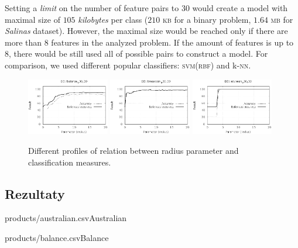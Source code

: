 \documentclass[]{article}
\begin{document}
{Setting a \emph{limit}  on the number of feature pairs  to $30$ would create a model with maximal size of $105$ \emph{kilobytes} per class ($210$ \textsc{kb} for a binary problem, $1.64$ \textsc{mb} for \emph{Salinas} dataset). However, the maximal size would be reached only if there are more than 8 features in the analyzed problem. If the amount of features is up to 8, there would be still used all of possible pairs to construct a model. For comparison, we used different popular classifiers: \textsc{svm(rbf)} and k-\textsc{nn}.

\begin{figure}[!ht]
  \includegraphics[width=0.32\textwidth]{figures/plot_balance_g30_l30}
  \includegraphics[width=0.32\textwidth]{figures/plot_breastcan_g30_l30}
  \includegraphics[width=0.32\textwidth]{figures/plot_soybean_g30_l30}
  
  \caption{Different profiles of relation between radius parameter and classification measures.}
	\label{fig:profiles}
\end{figure}

\subsection{Rezultaty}

\begin{table}[!ht]
    \parbox{.45\linewidth}{
	    \begin{ride}{products/australian.csv}{Australian}\end{ride}
	}
	\hfill
    \parbox{.45\linewidth}{
	    \begin{ride}{products/balance.csv}{Balance}\end{ride}
	}
\end{table}

}
\end{document}
